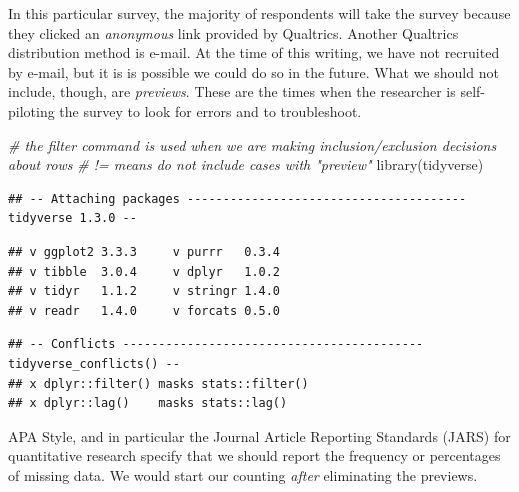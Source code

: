 \documentclass[
  english,
]{book}
\newenvironment{Shaded}{\begin{snugshade}}{\end{snugshade}}
\newcommand{\CommentTok}[1]{\textcolor[rgb]{0.56,0.35,0.01}{\textit{#1}}}
\newcommand{\FunctionTok}[1]{\textcolor[rgb]{0.00,0.00,0.00}{#1}}
\newcommand{\NormalTok}[1]{#1}
\newcommand{\OtherTok}[1]{\textcolor[rgb]{0.56,0.35,0.01}{#1}}
\newcommand{\SpecialCharTok}[1]{\textcolor[rgb]{0.00,0.00,0.00}{#1}}
\newcommand{\StringTok}[1]{\textcolor[rgb]{0.31,0.60,0.02}{#1}}
\begin{document}
In this particular survey, the majority of respondents will take the survey because they clicked an \emph{anonymous} link provided by Qualtrics. Another Qualtrics distribution method is e-mail. At the time of this writing, we have not recruited by e-mail, but it is is possible we could do so in the future. What we should not include, though, are \emph{previews}. These are the times when the researcher is self-piloting the survey to look for errors and to troubleshoot.

\begin{Shaded}
\begin{Highlighting}[]
\CommentTok{\# the filter command is used when we are making inclusion/exclusion decisions about rows}
\CommentTok{\# != means do not include cases with "preview"}
\FunctionTok{library}\NormalTok{(tidyverse)}
\end{Highlighting}
\end{Shaded}

\begin{verbatim}
## -- Attaching packages --------------------------------------- tidyverse 1.3.0 --
\end{verbatim}

\begin{verbatim}
## v ggplot2 3.3.3     v purrr   0.3.4
## v tibble  3.0.4     v dplyr   1.0.2
## v tidyr   1.1.2     v stringr 1.4.0
## v readr   1.4.0     v forcats 0.5.0
\end{verbatim}

\begin{verbatim}
## -- Conflicts ------------------------------------------ tidyverse_conflicts() --
## x dplyr::filter() masks stats::filter()
## x dplyr::lag()    masks stats::lag()
\end{verbatim}

\begin{Shaded}
\end{Shaded}

APA Style, and in particular the Journal Article Reporting Standards (JARS) for quantitative research specify that we should report the frequency or percentages of missing data. We would start our counting \emph{after} eliminating the previews.
\end{document}

